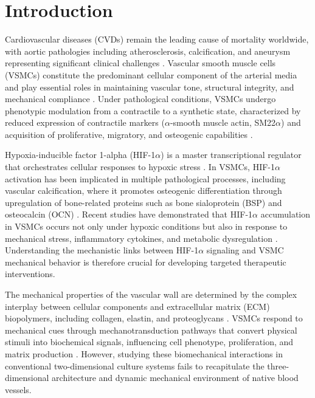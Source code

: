 \documentclass[materials,article,submit,moreauthors,pdftex]{Definitions/mdpi}
\begin{document}
\section{Introduction}

Cardiovascular diseases (CVDs) remain the leading cause of mortality worldwide, with aortic pathologies including atherosclerosis, calcification, and aneurysm representing significant clinical challenges \cite{roth2020global}. Vascular smooth muscle cells (VSMCs) constitute the predominant cellular component of the arterial media and play essential roles in maintaining vascular tone, structural integrity, and mechanical compliance \cite{owens2004molecular}. Under pathological conditions, VSMCs undergo phenotypic modulation from a contractile to a synthetic state, characterized by reduced expression of contractile markers ($\alpha$-smooth muscle actin, SM22$\alpha$) and acquisition of proliferative, migratory, and osteogenic capabilities \cite{bennett2016vascular}.

Hypoxia-inducible factor 1-alpha (HIF-1$\alpha$) is a master transcriptional regulator that orchestrates cellular responses to hypoxic stress \cite{semenza2012hypoxia}. In VSMCs, HIF-1$\alpha$ activation has been implicated in multiple pathological processes, including vascular calcification, where it promotes osteogenic differentiation through upregulation of bone-related proteins such as bone sialoprotein (BSP) and osteocalcin (OCN) \cite{mokas2016hypoxia}. Recent studies have demonstrated that HIF-1$\alpha$ accumulation in VSMCs occurs not only under hypoxic conditions but also in response to mechanical stress, inflammatory cytokines, and metabolic dysregulation \cite{gorlach2001thrombin}. Understanding the mechanistic links between HIF-1$\alpha$ signaling and VSMC mechanical behavior is therefore crucial for developing targeted therapeutic interventions.

The mechanical properties of the vascular wall are determined by the complex interplay between cellular components and extracellular matrix (ECM) biopolymers, including collagen, elastin, and proteoglycans \cite{humphrey2014mechanotransduction}. VSMCs respond to mechanical cues through mechanotransduction pathways that convert physical stimuli into biochemical signals, influencing cell phenotype, proliferation, and matrix production \cite{haga2007molecular}. However, studying these biomechanical interactions in conventional two-dimensional culture systems fails to recapitulate the three-dimensional architecture and dynamic mechanical environment of native blood vessels.
\end{document}

